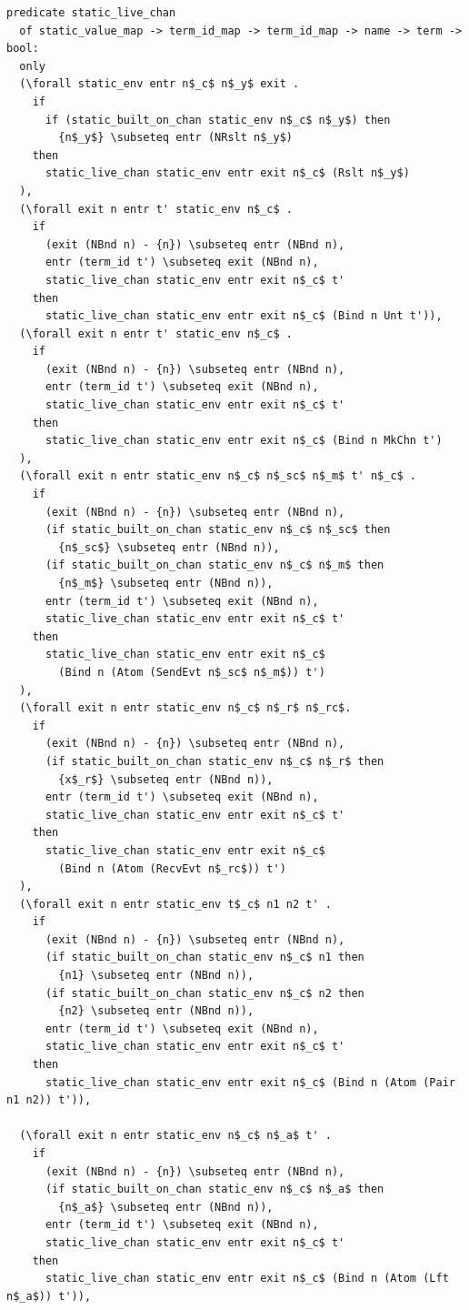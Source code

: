 \documentclass[10pt]{article}
\begin{document}
\begin{lstlisting}[language=logic, mathescape]
  predicate static_live_chan
  of static_value_map -> term_id_map -> term_id_map -> name -> term -> bool:
  only
  (\forall static_env entr n$_c$ n$_y$ exit .
    if
      if (static_built_on_chan static_env n$_c$ n$_y$) then
        {n$_y$} \subseteq entr (NRslt n$_y$)
    then
      static_live_chan static_env entr exit n$_c$ (Rslt n$_y$)
  ),
  (\forall exit n entr t' static_env n$_c$ .
    if 
      (exit (NBnd n) - {n}) \subseteq entr (NBnd n),
      entr (term_id t') \subseteq exit (NBnd n),
      static_live_chan static_env entr exit n$_c$ t'
    then 
      static_live_chan static_env entr exit n$_c$ (Bind n Unt t')),
  (\forall exit n entr t' static_env n$_c$ .
    if
      (exit (NBnd n) - {n}) \subseteq entr (NBnd n),
      entr (term_id t') \subseteq exit (NBnd n),
      static_live_chan static_env entr exit n$_c$ t'
    then 
      static_live_chan static_env entr exit n$_c$ (Bind n MkChn t')
  ),
  (\forall exit n entr static_env n$_c$ n$_sc$ n$_m$ t' n$_c$ .
    if
      (exit (NBnd n) - {n}) \subseteq entr (NBnd n),
      (if static_built_on_chan static_env n$_c$ n$_sc$ then
        {n$_sc$} \subseteq entr (NBnd n)),
      (if static_built_on_chan static_env n$_c$ n$_m$ then 
        {n$_m$} \subseteq entr (NBnd n)),
      entr (term_id t') \subseteq exit (NBnd n),
      static_live_chan static_env entr exit n$_c$ t'
    then
      static_live_chan static_env entr exit n$_c$
        (Bind n (Atom (SendEvt n$_sc$ n$_m$)) t')
  ),
  (\forall exit n entr static_env n$_c$ n$_r$ n$_rc$.    
    if
      (exit (NBnd n) - {n}) \subseteq entr (NBnd n),
      (if static_built_on_chan static_env n$_c$ n$_r$ then
        {x$_r$} \subseteq entr (NBnd n)),
      entr (term_id t') \subseteq exit (NBnd n),
      static_live_chan static_env entr exit n$_c$ t'
    then
      static_live_chan static_env entr exit n$_c$
        (Bind n (Atom (RecvEvt n$_rc$)) t')
  ),
  (\forall exit n entr static_env t$_c$ n1 n2 t' .
    if
      (exit (NBnd n) - {n}) \subseteq entr (NBnd n),
      (if static_built_on_chan static_env n$_c$ n1 then
        {n1} \subseteq entr (NBnd n)),
      (if static_built_on_chan static_env n$_c$ n2 then
        {n2} \subseteq entr (NBnd n)),
      entr (term_id t') \subseteq exit (NBnd n),
      static_live_chan static_env entr exit n$_c$ t'
    then
      static_live_chan static_env entr exit n$_c$ (Bind n (Atom (Pair n1 n2)) t')),

  (\forall exit n entr static_env n$_c$ n$_a$ t' . 
    if
      (exit (NBnd n) - {n}) \subseteq entr (NBnd n),
      (if static_built_on_chan static_env n$_c$ n$_a$ then
        {n$_a$} \subseteq entr (NBnd n)),
      entr (term_id t') \subseteq exit (NBnd n),
      static_live_chan static_env entr exit n$_c$ t'
    then
      static_live_chan static_env entr exit n$_c$ (Bind n (Atom (Lft n$_a$)) t')),


\end{lstlisting}
\end{document}
